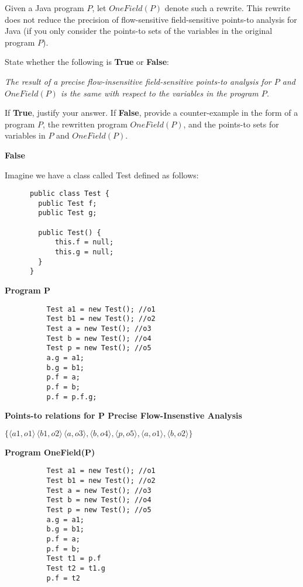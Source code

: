 \documentclass[12pt]{article}
\begin{document}
\begin{enumerate}
  Given a Java program $P$, let $OneField(P)$ denote such a rewrite.
  This rewrite does not reduce the precision of flow-sensitive field-sensitive points-to analysis for Java
  (if you only consider the points-to sets of the variables in the original program $P$).
  
  State whether the following is \textbf{True} or \textbf{False}:

  \emph{The result of a precise flow-insensitive field-sensitive points-to analysis 
  for $P$ and $OneField(P)$ is the same with respect to the variables in 
  the program $P$.}

  If \textbf{True}, justify your answer.
  If \textbf{False}, provide a counter-example in the form of a program $P$,
  the rewritten program $OneField(P)$, and the points-to sets for variables
  in $P$ and $OneField(P)$.
    
  \begin{mdframed}
    \textbf{False}

    Imagine we have a class called Test defined as follows:

    \begin{lstlisting}
      public class Test {
        public Test f;
        public Test g;

        public Test() {
            this.f = null;
            this.g = null;
        }
      }

    \end{lstlisting}

    \textbf{Program P}
        \begin{lstlisting}
          Test a1 = new Test(); //o1
          Test b1 = new Test(); //o2
          Test a = new Test(); //o3
          Test b = new Test(); //o4
          Test p = new Test(); //o5
          a.g = a1;
          b.g = b1;
          p.f = a;
          p.f = b;
          p.f = p.f.g;
        \end{lstlisting}
        \textbf{Points-to relations for P Precise Flow-Insenstive Analysis}

        $\{\langle a1, o1 \rangle\, \langle b1, o2 \rangle\, \langle a, o3 \rangle, \langle b, o4 \rangle, \langle p, o5 \rangle, \langle a, o1 \rangle, \langle b, o2 \rangle \}$

        \textbf{Program OneField(P)}
        \begin{lstlisting}
          Test a1 = new Test(); //o1
          Test b1 = new Test(); //o2
          Test a = new Test(); //o3
          Test b = new Test(); //o4
          Test p = new Test(); //o5
          a.g = a1;
          b.g = b1;
          p.f = a;
          p.f = b;
          Test t1 = p.f
          Test t2 = t1.g
          p.f = t2
        \end{lstlisting}


\end{mdframed}
\end{enumerate}
\end{document}
